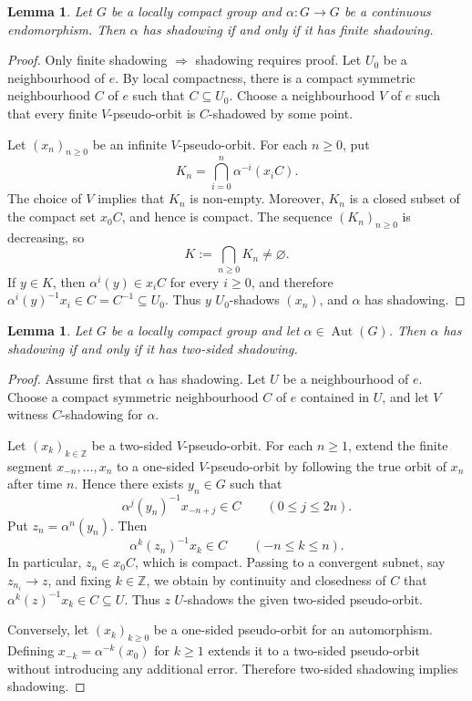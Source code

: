 \documentclass[12pt]{amsart}
\newtheorem{lemma}[theorem]{Lemma}
\theoremstyle{definition}
\numberwithin{equation}{section}
\theoremstyle{remark}
\begin{document}
\begin{lemma}\label{ShadFin}
Let $G$ be a locally compact group and $\alpha: G\to G$ be a continuous endomorphism. Then $\alpha$ has shadowing if and only if it has finite shadowing.
\end{lemma}
\begin{proof}
Only finite shadowing $\Rightarrow$ shadowing requires proof. Let $U_0$ be
a neighbourhood of $e$. By local compactness, there is a compact symmetric
neighbourhood $C$ of $e$ such that $C\subseteq U_0$. Choose a neighbourhood
$V$ of $e$ such that every finite $V$-pseudo-orbit is $C$-shadowed by some
point.

Let $(x_n)_{n\geq 0}$ be an infinite $V$-pseudo-orbit. For each $n\geq 0$,
put
\[
K_n=\bigcap_{i=0}^n\alpha^{-i}(x_iC).
\]
The choice of $V$ implies that $K_n$ is non-empty. Moreover, $K_n$ is a
closed subset of the compact set $x_0C$, and hence is compact. The sequence
$(K_n)_{n\geq 0}$ is decreasing, so
\[
K:=\bigcap_{n\geq 0}K_n\neq\varnothing.
\]
If $y\in K$, then $\alpha^i(y)\in x_iC$ for every $i\geq 0$, and therefore
$\alpha^i(y)^{-1}x_i\in C=C^{-1}\subseteq U_0$. Thus $y$ $U_0$-shadows
$(x_n)$, and $\alpha$ has shadowing.
\end{proof}

\begin{lemma}\label{lem:one-two-sided}
Let $G$ be a locally compact group and let
$\alpha\in\operatorname{Aut}(G)$. Then $\alpha$ has shadowing if and only if
it has two-sided shadowing.
\end{lemma}

\begin{proof}
Assume first that $\alpha$ has shadowing. Let $U$ be a neighbourhood of
$e$. Choose a compact symmetric neighbourhood $C$ of $e$ contained in $U$,
and let $V$ witness $C$-shadowing for $\alpha$.

Let $(x_k)_{k\in\mathbb Z}$ be a two-sided $V$-pseudo-orbit. For each
$n\geq 1$, extend the finite segment
$x_{-n},\ldots,x_n$ to a one-sided $V$-pseudo-orbit by following the true
orbit of $x_n$ after time $n$. Hence there exists $y_n\in G$ such that
\[
\alpha^j(y_n)^{-1}x_{-n+j}\in C
\qquad (0\leq j\leq 2n).
\]
Put $z_n=\alpha^n(y_n)$. Then
\[
\alpha^k(z_n)^{-1}x_k\in C
\qquad (-n\leq k\leq n).
\]
In particular, $z_n\in x_0C$, which is compact. Passing to a convergent
subnet, say $z_{n_i}\to z$, and fixing $k\in\mathbb Z$, we obtain by
continuity and closedness of $C$ that
$\alpha^k(z)^{-1}x_k\in C\subseteq U$. Thus $z$ $U$-shadows the given
two-sided pseudo-orbit.

Conversely, let $(x_k)_{k\geq 0}$ be a one-sided pseudo-orbit for an
automorphism. Defining $x_{-k}=\alpha^{-k}(x_0)$ for $k\geq 1$ extends it
to a two-sided pseudo-orbit without introducing any additional error.
Therefore two-sided shadowing implies shadowing.
\end{proof}
\end{document}
